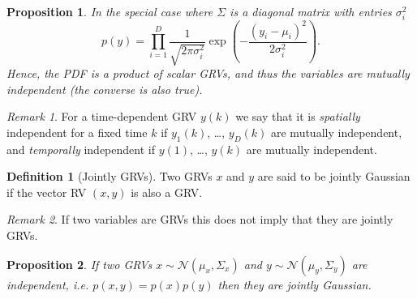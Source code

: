 \documentclass[]{hsrzf}
\theoremstyle{plain}
\newtheorem{prop}{Proposition}[section]
\theoremstyle{definition}
\newtheorem{defn}{Definition}[section]
\theoremstyle{remark}
\newtheorem*{remark}{Remark}
\begin{document}
\begin{prop}
  In the special case where $\Sigma$ is a diagonal matrix with entries
  $\sigma^2_i$
  \[
    p(y) = \prod_{i=1}^D \frac{1}{\sqrt{2\pi \sigma^2_i}}
      \exp\left(-\frac{(y_i - \mu_i)^2}{2\sigma^2_i}\right).
  \]
  Hence, the PDF is a product of scalar GRVs, and thus the variables are
  mutually independent (the converse is also true).
\end{prop}

\begin{remark}
  For a time-dependent GRV $y(k)$ we say that it is \emph{spatially}
  independent for a fixed time $k$ if $y_1(k)$, \dots, $y_D(k)$ are
  mutually independent, and \emph{temporally} independent if $y(1)$, \dots,
  $y(k)$ are mutually independent.
\end{remark}

\begin{defn}[Jointly GRVs]
  Two GRVs $x$ and $y$ are said to be jointly Gaussian if the vector RV $(x,
  y)$ is also a GRV.
\end{defn}

\begin{remark}
  If two variables are GRVs this does not imply that they are jointly GRVs.
\end{remark}

\begin{prop} \label{lem:independent-grvs-joint}
  If two GRVs $x \sim \mathcal{N}(\mu_x, \Sigma_x)$ and $y \sim
  \mathcal{N}(\mu_y, \Sigma_y)$ are independent, i.e. $p(x,y) = p(x)p(y)$
  then they are jointly Gaussian.
\end{prop}
\end{document}
